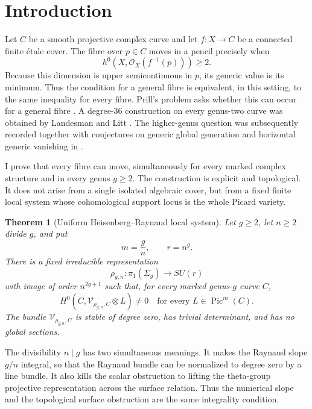 \documentclass[11pt,reqno]{amsart}
\numberwithin{equation}{section}
\newtheorem{theorem}{Theorem}[section]
\theoremstyle{remark}
\DeclareMathOperator{\Pic}{Pic}
\newcommand{\cO}{\mathcal O}
\newcommand{\cV}{\mathcal V}
\begin{document}
\maketitle

\section{Introduction}

Let \(C\) be a smooth projective complex curve and let
\(f\colon X\to C\) be a connected finite \'etale cover.  The fibre over
\(p\in C\) moves in a pencil precisely when
\[
 h^0\!\left(X,\cO_X(f^{-1}(p))\right)\geq2.
\]
Because this dimension is upper semicontinuous in \(p\), its generic
value is its minimum.  Thus the condition for a general fibre is
equivalent, in this setting, to the same inequality for every fibre.
Prill's problem asks whether this can occur for a general fibre
\cite[Chapter VI, Exercise D, p.~268]{ACGH}.  A
degree-\(36\) construction on every genus-two curve was obtained by
Landesman and Litt \cite{LandesmanLittPrill}.  The higher-genus question
was subsequently recorded together with conjectures on generic global
generation and horizontal generic vanishing in \cite[\S6.3]{LittMotives}.

I prove that every fibre can move, simultaneously for every marked
complex structure and in every genus \(g\geq2\).  The construction is
explicit and topological.  It does not arise from a single isolated
algebraic cover, but from a fixed finite local system whose cohomological
support locus is the whole Picard variety.

\begin{theorem}[Uniform Heisenberg--Raynaud local system]\label{thm:intro-uniform}
Let \(g\geq2\), let \(n\geq2\) divide \(g\), and put
\[
 m=\frac gn,\qquad r=n^g.
\]
There is a fixed irreducible representation
\[
 \rho_{g,n}\colon\pi_1(\Sigma_g)\longrightarrow SU(r)
\]
with image of order \(n^{2g+1}\) such that, for every marked genus-\(g\)
curve \(C\),
\[
 H^0(C,\cV_{\rho_{g,n},C}\otimes L)\neq0
 \quad\text{for every }L\in\Pic^m(C).
 \tag{1.1}\label{eq:intro-full-support}
\]
The bundle \(\cV_{\rho_{g,n},C}\) is stable of degree zero, has trivial
determinant, and has no global sections.
\end{theorem}

The divisibility \(n\mid g\) has two simultaneous meanings.  It makes the
Raynaud slope \(g/n\) integral, so that the Raynaud bundle can be
normalized to degree zero by a line bundle.  It also kills the scalar
obstruction to lifting the theta-group projective representation across
the surface relation.  Thus the numerical slope and the topological
surface obstruction are the same integrality condition.
\end{document}
